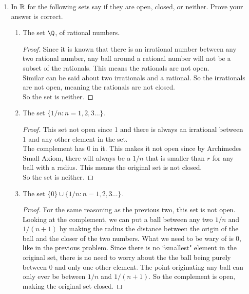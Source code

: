 \documentclass[14pt]{extarticle}
\begin{document}
\begin{enumerate}
		\item In $\mathbb{R}$ for the following sets say if they are open, closed, or neither. Prove your answer is correct.
		\begin{enumerate}
			\item The set $\Q$, of rational numbers.
			\begin{proof}
				Since it is known that there is an irrational number between any two rational number, any ball around a rational number will not be a subset of the rationals. This means the rationals are not open.\\
				Similar can be said about two irrationals and a rational. So the irrationals are not open, meaning the rationals are not closed.\\ 
				So the set is neither.
			\end{proof}
			\item The set $\{1/n : n = 1,2,3 \ldots\}$.
			\begin{proof}
				This set not open since 1 and there is always an irrational between 1 and any other element in the set.\\
				The complement has 0 in it. This makes it not open since by Archimedes Small Axiom, there will always be a $1/n$ that is smaller than $r$ for any ball with a radius. This means the original set is not closed.\\
				So the set is neither.
			\end{proof}
			\item The set $\{0\} \cup \{1/n : n = 1,2,3 \ldots\}$.
			\begin{proof}
				For the same reasoning as the previous two, this set is not open.\\
				Looking at the complement, we can put a ball between any two $1/n$ and $1/(n+1)$ by making the radius the distance between the origin of the ball and the closer of the two numbers. What we need to be wary of is 0, like in the previous problem. Since there is no ``smallest" element in the original set, there is no need to worry about the the ball being purely between 0 and only one other element. The point originating any ball can only ever be between $1/n$ and $1/(n+1)$. So the complement is open, making the original set closed.
			\end{proof}
		\end{enumerate}
		

\end{enumerate}
\end{document}
